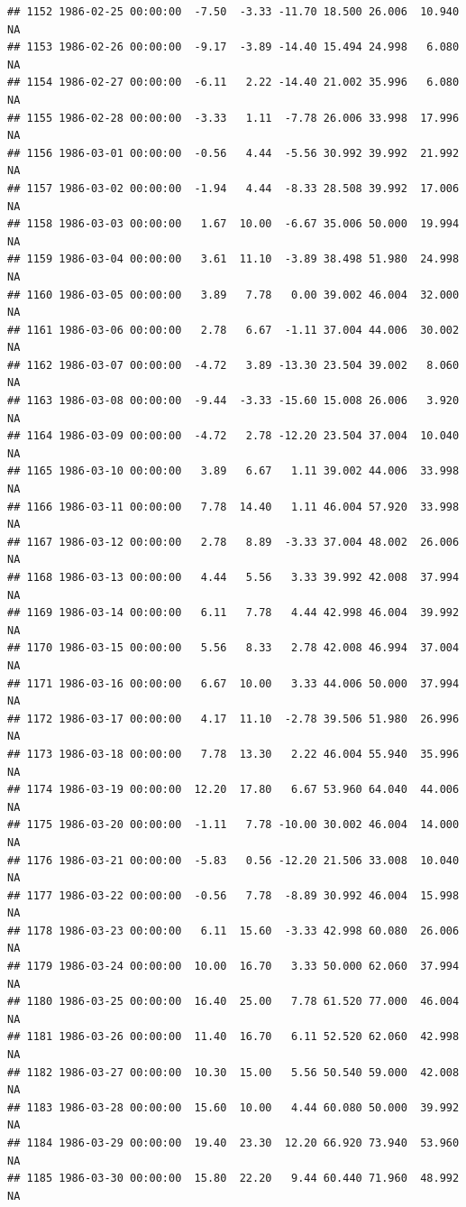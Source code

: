 \documentclass{article}\usepackage{graphicx, color}
\makeatletter
\newenvironment{kframe}{%
 \def\at@end@of@kframe{}%
 \ifinner\ifhmode%
  \def\at@end@of@kframe{\end{minipage}}%
  \begin{minipage}{\columnwidth}%
 \fi\fi%
 \def\FrameCommand##1{\hskip\@totalleftmargin \hskip-\fboxsep
 \colorbox{shadecolor}{##1}\hskip-\fboxsep
     \hskip-\linewidth \hskip-\@totalleftmargin \hskip\columnwidth}%
 \MakeFramed {\advance\hsize-\width
   \@totalleftmargin\z@ \linewidth\hsize
   \@setminipage}}%
 {\par\unskip\endMakeFramed%
 \at@end@of@kframe}
\newenvironment{knitrout}{}{} %
\makeatother
\begin{document}
\begin{knitrout}
\begin{kframe}
\begin{verbatim}
## 1152 1986-02-25 00:00:00  -7.50  -3.33 -11.70 18.500 26.006  10.940     NA
## 1153 1986-02-26 00:00:00  -9.17  -3.89 -14.40 15.494 24.998   6.080     NA
## 1154 1986-02-27 00:00:00  -6.11   2.22 -14.40 21.002 35.996   6.080     NA
## 1155 1986-02-28 00:00:00  -3.33   1.11  -7.78 26.006 33.998  17.996     NA
## 1156 1986-03-01 00:00:00  -0.56   4.44  -5.56 30.992 39.992  21.992     NA
## 1157 1986-03-02 00:00:00  -1.94   4.44  -8.33 28.508 39.992  17.006     NA
## 1158 1986-03-03 00:00:00   1.67  10.00  -6.67 35.006 50.000  19.994     NA
## 1159 1986-03-04 00:00:00   3.61  11.10  -3.89 38.498 51.980  24.998     NA
## 1160 1986-03-05 00:00:00   3.89   7.78   0.00 39.002 46.004  32.000     NA
## 1161 1986-03-06 00:00:00   2.78   6.67  -1.11 37.004 44.006  30.002     NA
## 1162 1986-03-07 00:00:00  -4.72   3.89 -13.30 23.504 39.002   8.060     NA
## 1163 1986-03-08 00:00:00  -9.44  -3.33 -15.60 15.008 26.006   3.920     NA
## 1164 1986-03-09 00:00:00  -4.72   2.78 -12.20 23.504 37.004  10.040     NA
## 1165 1986-03-10 00:00:00   3.89   6.67   1.11 39.002 44.006  33.998     NA
## 1166 1986-03-11 00:00:00   7.78  14.40   1.11 46.004 57.920  33.998     NA
## 1167 1986-03-12 00:00:00   2.78   8.89  -3.33 37.004 48.002  26.006     NA
## 1168 1986-03-13 00:00:00   4.44   5.56   3.33 39.992 42.008  37.994     NA
## 1169 1986-03-14 00:00:00   6.11   7.78   4.44 42.998 46.004  39.992     NA
## 1170 1986-03-15 00:00:00   5.56   8.33   2.78 42.008 46.994  37.004     NA
## 1171 1986-03-16 00:00:00   6.67  10.00   3.33 44.006 50.000  37.994     NA
## 1172 1986-03-17 00:00:00   4.17  11.10  -2.78 39.506 51.980  26.996     NA
## 1173 1986-03-18 00:00:00   7.78  13.30   2.22 46.004 55.940  35.996     NA
## 1174 1986-03-19 00:00:00  12.20  17.80   6.67 53.960 64.040  44.006     NA
## 1175 1986-03-20 00:00:00  -1.11   7.78 -10.00 30.002 46.004  14.000     NA
## 1176 1986-03-21 00:00:00  -5.83   0.56 -12.20 21.506 33.008  10.040     NA
## 1177 1986-03-22 00:00:00  -0.56   7.78  -8.89 30.992 46.004  15.998     NA
## 1178 1986-03-23 00:00:00   6.11  15.60  -3.33 42.998 60.080  26.006     NA
## 1179 1986-03-24 00:00:00  10.00  16.70   3.33 50.000 62.060  37.994     NA
## 1180 1986-03-25 00:00:00  16.40  25.00   7.78 61.520 77.000  46.004     NA
## 1181 1986-03-26 00:00:00  11.40  16.70   6.11 52.520 62.060  42.998     NA
## 1182 1986-03-27 00:00:00  10.30  15.00   5.56 50.540 59.000  42.008     NA
## 1183 1986-03-28 00:00:00  15.60  10.00   4.44 60.080 50.000  39.992     NA
## 1184 1986-03-29 00:00:00  19.40  23.30  12.20 66.920 73.940  53.960     NA
## 1185 1986-03-30 00:00:00  15.80  22.20   9.44 60.440 71.960  48.992     NA

\end{verbatim}
\end{kframe}
\end{knitrout}
\end{document}
